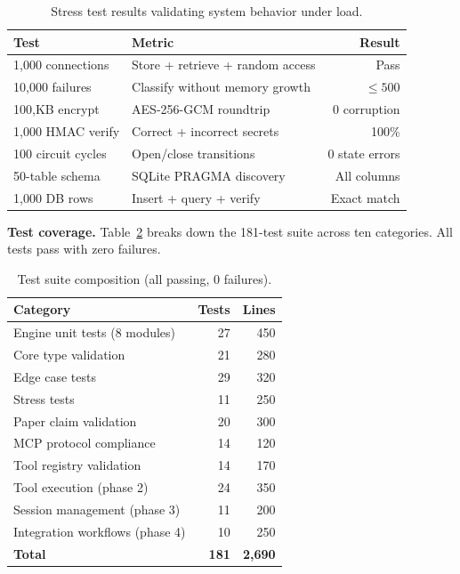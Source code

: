 \documentclass[10pt, twocolumn]{article}
\begin{document}
\begin{table}[h]
\caption{Stress test results validating system behavior under load.}
\label{tab:stress}
\centering
\scriptsize
\begin{tabular}{@{}llr@{}}
\toprule
\textbf{Test} & \textbf{Metric} & \textbf{Result} \\
\midrule
1{,}000 connections & Store + retrieve + random access & Pass \\
10{,}000 failures & Classify without memory growth & $\le 500$ \\
100{,}KB encrypt & AES-256-GCM roundtrip & 0 corruption \\
1{,}000 HMAC verify & Correct + incorrect secrets & 100\% \\
100 circuit cycles & Open/close transitions & 0 state errors \\
50-table schema & SQLite PRAGMA discovery & All columns \\
1{,}000 DB rows & Insert + query + verify & Exact match \\
\bottomrule
\end{tabular}
\end{table}

\textbf{Test coverage.} Table~\ref{tab:tests} breaks down the 181-test suite across ten categories. All tests pass with zero failures.

\begin{table}[h]
\caption{Test suite composition (all passing, 0 failures).}
\label{tab:tests}
\centering
\scriptsize
\begin{tabular}{@{}lrr@{}}
\toprule
\textbf{Category} & \textbf{Tests} & \textbf{Lines} \\
\midrule
Engine unit tests (8 modules) & 27 & 450 \\
Core type validation & 21 & 280 \\
Edge case tests & 29 & 320 \\
Stress tests & 11 & 250 \\
Paper claim validation & 20 & 300 \\
MCP protocol compliance & 14 & 120 \\
Tool registry validation & 14 & 170 \\
Tool execution (phase 2) & 24 & 350 \\
Session management (phase 3) & 11 & 200 \\
Integration workflows (phase 4) & 10 & 250 \\
\midrule
\textbf{Total} & \textbf{181} & \textbf{2{,}690} \\
\bottomrule
\end{tabular}
\end{table}
\end{document}
